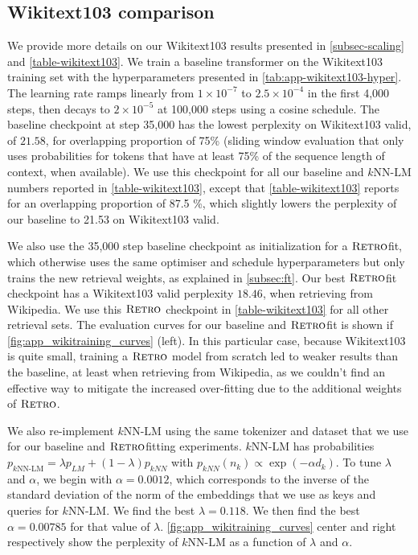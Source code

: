 \documentclass[11pt, a4paper, logo]{deepmind}
\newcommand{\knnlm}{k\textrm{NN-LM}}
\newcommand{\retro}{\textsc{Retro}\xspace}
\begin{document}
\subsection{Wikitext103 comparison}
\label{subsubsec-app-wikitext103}
We provide more details on our Wikitext103 results presented in \autoref{subsec-scaling} and \autoref{table-wikitext103}. We train a baseline transformer on the Wikitext103 training set with the hyperparameters presented in \autoref{tab:app-wikitext103-hyper}. The learning rate ramps linearly from $1 \times 10^{-7}$ to $2.5 \times 10^{-4}$ in the first 4,000 steps, then decays to $2 \times 10^{-5}$ at 100,000 steps using a cosine schedule. The baseline checkpoint at step 35,000 has the lowest perplexity on Wikitext103 valid, of $21.58$, for overlapping proportion of 75\% (sliding window evaluation that only uses probabilities for tokens that have at least 75\% of the sequence length of context, when available). We use this checkpoint for all our baseline and $\knnlm$ numbers reported in \autoref{table-wikitext103}, except that \autoref{table-wikitext103} reports for an overlapping proportion of 87.5 \%, which slightly lowers the perplexity of our baseline to 21.53 on Wikitext103 valid.

We also use the 35,000 step baseline checkpoint as initialization for a $\retro$fit, which otherwise uses the same optimiser and schedule hyperparameters but only trains the new retrieval weights, as explained in \autoref{subsec:ft}. Our best $\retro$fit checkpoint has a Wikitext103 valid perplexity $18.46$, when retrieving from Wikipedia. We use this $\retro$ checkpoint in \autoref{table-wikitext103} for all other retrieval sets. The evaluation curves for our baseline and $\retro$fit is shown if \autoref{fig:app_wikitraining_curves} (left). In this particular case, because Wikitext103 is quite small, training a $\retro$ model from scratch led to weaker results than the baseline, at least when retrieving from Wikipedia, as we couldn't find an effective way to mitigate the increased over-fitting due to the additional weights of $\retro$.

We also re-implement $\knnlm$ using the same tokenizer and dataset that we use for our baseline and $\retro$fitting experiments. $\knnlm$ has probabilities $p_{\knnlm}= \lambda p_{LM}  + (1-\lambda) p_{kNN}$ with $p_{kNN}(n_k) \propto \exp(-\alpha d_k)$. To tune $\lambda$ and $\alpha$, we begin with $\alpha=0.0012$, which corresponds to the inverse of the standard deviation of the norm of the embeddings that we use as keys and queries for $\knnlm$. We find the best $\lambda=0.118$. We then find the best $\alpha=0.00785$ for that value of $\lambda$. \autoref{fig:app_wikitraining_curves} center and right respectively show the perplexity of $\knnlm$ as a function of $\lambda$ and $\alpha$.
\end{document}
